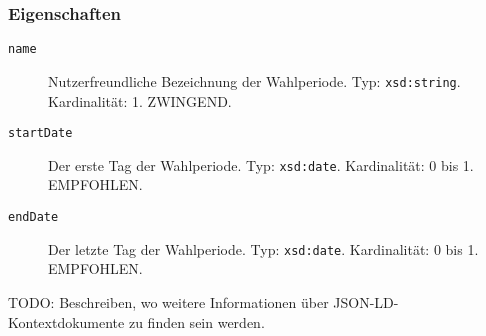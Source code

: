 \documentclass[,a4paper]{article}
\begin{document}
\subsubsection{Eigenschaften}\label{eigenschaften-11}

\begin{description}
\item[\texttt{name}]
Nutzerfreundliche Bezeichnung der Wahlperiode. Typ: \texttt{xsd:string}.
Kardinalität: 1. ZWINGEND.
\item[\texttt{startDate}]
Der erste Tag der Wahlperiode. Typ: \texttt{xsd:date}. Kardinalität: 0
bis 1. EMPFOHLEN.
\item[\texttt{endDate}]
Der letzte Tag der Wahlperiode. Typ: \texttt{xsd:date}. Kardinalität: 0
bis 1. EMPFOHLEN.
\end{description}


TODO: Beschreiben, wo weitere Informationen über
JSON-LD-Kontextdokumente zu finden sein werden.
\end{document}
